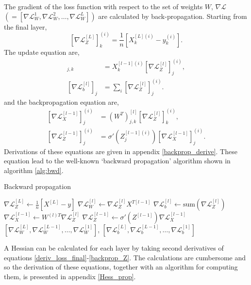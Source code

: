 \documentclass[11pt,twocolumn]{article}
\begin{document}
The gradient of the loss function with respect to the set of weights $W$, $\nabla \mathcal{L}$ $(=[\nabla \mathcal{L}^1_{W},\nabla \mathcal{L}^2_{W},\ldots,\nabla \mathcal{L}^L_{W}])$ are calculated by back-propagation. Starting from the final layer,
\begin{equation}
\left[\nabla \mathcal{L}^{[L]}
_{Z}\right]^{(i)}_k=\frac{1}{n}\left[X^{[L](i)}_k-y^{(i)}_k\right].\label{deriv_loss_final}
\end{equation}
The update equation are,
\begin{align}
[\nabla \mathcal{L}^{[l]}_{W}]_{j,k}&=X_{k}^{[l-1](i)}\left[\nabla \mathcal{L}^{[l]}_{Z}\right]^{(i)}_j,\label{gradW}\\
[\nabla \mathcal{L}^{[l]}_{b}]_j&=\sum_{i}\left[\nabla \mathcal{L}^{[l]}_{Z}\right]^{(i)}_j.\label{gradb}
\end{align}
and the backpropagation equation are,
\begin{align}
\left[ \nabla \mathcal{L}^{[l-1]}_{X}\right]^{(i)}_j&=\left(W^{T}\right)_{j,k}^{[l]}\left[\nabla \mathcal{L}^{[l]}_{Z}
\right]^{(i)}_k,\label{backprop_X}\\
\left[\nabla \mathcal{L}_{Z}^{[l-1]}\right]^{(i)}_j&= \sigma'{(Z_{j}^{[l-1](i)})}\left[\nabla \mathcal{L}_{X}^{[l-1]}\right]^{(i)}_j.\label{backprop_Z}\end{align}
Derivations of these equations are given in appendix \ref{backprop_derive}. These equation lead to the well-known `backward propagation' algorithm shown in algorithm \ref{alg:bwd}.
\begin{algorithm}
\caption{Backward propagation}\label{alg:bwd}
\begin{algorithmic}
\Procedure {backwardprop}{\textit{list(array)} $W=[W^1,W^2,\ldots, W^L]$,\textit{list(array)} $Z=[X^{[L]}, X^{[L-1]},\ldots,X^{[0]}$, $\textrm{array}(m)$ $y$}
	\State $\nabla \mathcal{L}^{[L]}_{Z} \gets \frac{1}{n}\left[X^{[L]}-y \right]$
		\State $\nabla \mathcal{L}^{[l]}_{W} \gets  \nabla \mathcal{L}^{[l]}_{Z}X^{T[l-1]} $
		\State $\nabla \mathcal{L}^{[l]}_{b} \gets \textrm{sum}{(\nabla \mathcal{L}^{[l]}_{Z})}$
		\State $\nabla \mathcal{L}^{[l-1]}_{X} \gets W^{(l)T}\nabla \mathcal{L}^{[l]}_{Z}$
		\State $\nabla \mathcal{L}_{Z}^{[l-1]}\gets \sigma'{(Z^{[l-1]})} \nabla \mathcal{L}_{X}^{[l-1]}$
	\EndFor
	\State \Return $[\nabla \mathcal{L}^{[L]}_{W} , \nabla \mathcal{L}^{[L-1]}_{W}, \ldots,  \nabla \mathcal{L}^{[1]}_{W}]$, $[\nabla \mathcal{L}^{[L]}_{b} , \nabla \mathcal{L}^{[L-1]}_{b}, \ldots,  \nabla \mathcal{L}^{[1]}_{b}]$
\EndProcedure
\end{algorithmic}
\end{algorithm}
A Hessian can be calculated for each layer by taking second derivatives of equations \ref{deriv_loss_final}-\ref{backprop_Z}. The calculations are cumbersome and so the derivation of these equations, together with an algorithm for computing them, is presented in appendix \ref{Hess_prop}.
\end{document}
